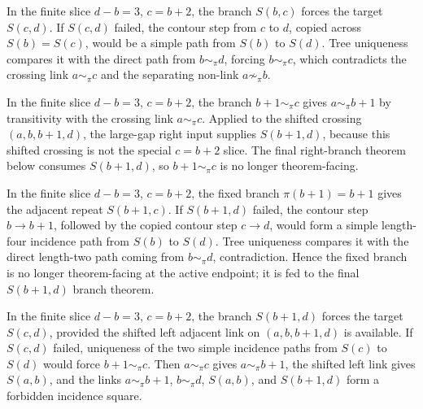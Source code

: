 \begin{theorem}
  \label{thm:right-gap-three-S-b-c}
  \leanok
  In the finite slice \(d-b=3\), \(c=b+2\), the branch \(S(b,c)\) forces the
  target \(S(c,d)\).  If \(S(c,d)\) failed, the contour step from \(c\) to
  \(d\), copied across \(S(b)=S(c)\), would be a simple path from \(S(b)\) to
  \(S(d)\).  Tree uniqueness compares it with the direct path from
  \(b\sim_\pi d\), forcing \(b\sim_\pi c\), which contradicts the crossing
  link \(a\sim_\pi c\) and the separating non-link \(a\not\sim_\pi b\).
\end{theorem}

\begin{theorem}
  \label{thm:right-gap-three-T-b1-c}
  \leanok
  In the finite slice \(d-b=3\), \(c=b+2\), the branch
  \(b+1\sim_\pi c\) gives \(a\sim_\pi b+1\) by transitivity with the crossing
  link \(a\sim_\pi c\).  Applied to the shifted crossing \((a,b,b+1,d)\), the
  large-gap right input supplies \(S(b+1,d)\), because this shifted crossing
  is not the special \(c=b+2\) slice.  The final right-branch theorem below
  consumes \(S(b+1,d)\), so \(b+1\sim_\pi c\) is no longer theorem-facing.
\end{theorem}

\begin{theorem}
  \label{thm:right-gap-three-fixed-b1}
  \leanok
  In the finite slice \(d-b=3\), \(c=b+2\), the fixed branch
  \(\pi(b+1)=b+1\) gives the adjacent repeat \(S(b+1,c)\).  If \(S(b+1,d)\)
  failed, the contour step \(b\to b+1\), followed by the copied contour step
  \(c\to d\), would form a simple length-four incidence path from \(S(b)\) to
  \(S(d)\).  Tree uniqueness compares it with the direct length-two path
  coming from \(b\sim_\pi d\), contradiction.  Hence the fixed branch is no
  longer theorem-facing at the active endpoint; it is fed to the final
  \(S(b+1,d)\) branch theorem.
\end{theorem}

\begin{theorem}
  \label{thm:right-gap-three-S-b1-d}
  \leanok
  In the finite slice \(d-b=3\), \(c=b+2\), the branch \(S(b+1,d)\) forces the
  target \(S(c,d)\), provided the shifted left adjacent link on
  \((a,b,b+1,d)\) is available.  If \(S(c,d)\) failed, uniqueness of the two
  simple incidence paths from \(S(c)\) to \(S(d)\) would force
  \(b+1\sim_\pi c\).  Then \(a\sim_\pi c\) gives \(a\sim_\pi b+1\), the
  shifted left link gives \(S(a,b)\), and the links
  \(a\sim_\pi b+1\), \(b\sim_\pi d\), \(S(a,b)\), and \(S(b+1,d)\) form a
  forbidden incidence square.
\end{theorem}

